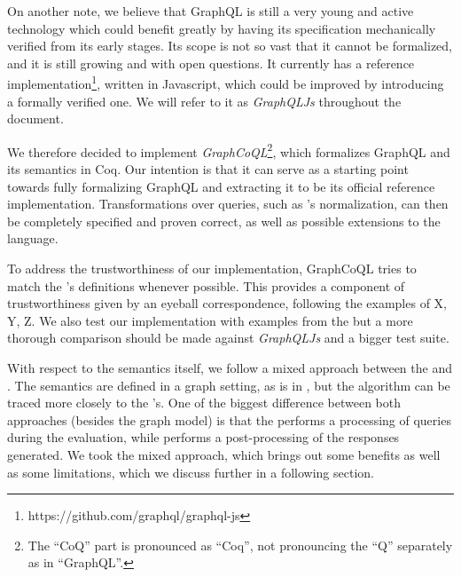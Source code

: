 
On another note, we believe that GraphQL is still a very young and active technology which could benefit greatly by having its specification mechanically verified from its early stages. Its scope is not so vast that it cannot be formalized, and it is still growing and with open questions. It currently has a reference implementation\footnote{https://github.com/graphql/graphql-js}, written in Javascript, which could be improved by introducing a formally verified one. We will refer to it as \textit{GraphQLJs} throughout the document.

 We therefore decided to implement \textit{GraphCoQL}\footnote{The ``CoQ'' part is pronounced as ``Coq'', not pronouncing the ``Q'' separately as in ``GraphQL''.}, which formalizes GraphQL and its semantics in Coq. Our intention is that it can serve as a starting point towards fully formalizing GraphQL and extracting it to be its official reference implementation.  Transformations over queries, such as \HP{}'s normalization, can then be completely specified and proven correct, as well as possible extensions to the language.

To address the trustworthiness of our implementation, GraphCoQL tries to match the \spec{}'s definitions whenever possible. This provides a component of trustworthiness given by an eyeball correspondence, following the examples of X, Y, Z. We also test our implementation with examples from the \spec{} but a more thorough comparison should be made against \textit{GraphQLJs} and a bigger test suite.

With respect to the semantics itself, we follow a mixed approach between the \spec{} and \HP{}. The semantics are defined in a graph setting, as is in \HP{}, but the algorithm can be traced more closely to the \spec{}'s. One of the biggest difference between both approaches (besides the graph model) is that the \spec{} performs a processing of queries during the evaluation, while \HP{} performs a post-processing of the responses generated. We took the mixed approach, which brings out some benefits as well as some limitations, which we discuss further in a following section.

